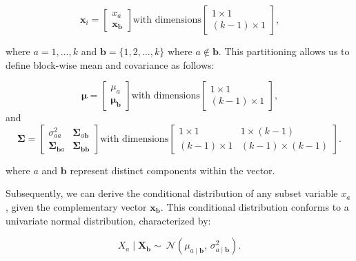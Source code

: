\begin{equation}
 \boldsymbol{x}_i = \begin{bmatrix}x_a \\ \boldsymbol{x_b} \end{bmatrix} \text{with dimensions} \begin{bmatrix}1\times 1 \\ (k - 1) \times 1\end{bmatrix} \text{,}
\end{equation}

where $a = 1,...,k$ and $\boldsymbol{b} = \{1, 2, \ldots, k\} \text{ where }a \notin \boldsymbol{b}$. This partitioning allows us to define block-wise mean and covariance as follows:

\begin{equation}
 \boldsymbol\mu = \begin{bmatrix}\mu_a \\ \boldsymbol{\mu_b} \end{bmatrix} \text{with dimensions} \begin{bmatrix}1\times 1 \\ (k - 1) \times 1\end{bmatrix} \text{,}
\end{equation}
and
\begin{equation}
 \boldsymbol\Sigma = \begin{bmatrix}\sigma_{aa}^2 & \boldsymbol\Sigma_{a\boldsymbol{b}} \\ \boldsymbol\Sigma_{\boldsymbol{b}a} & \boldsymbol\Sigma_{\boldsymbol{bb}} \end{bmatrix}
 \text{with dimensions} \begin{bmatrix}1\times 1 & 1\times (k - 1) \\ (k - 1) \times 1 & (k - 1) \times (k - 1)\end{bmatrix} \text{.} \label{eq:sigma}
\end{equation}

where $a$ and $\boldsymbol{b}$ represent distinct components within the vector.

Subsequently, we can derive the conditional distribution of any subset variable $x_a$, given the complementary vector $\boldsymbol{x_b}$. This conditional distribution conforms to a univariate normal distribution, characterized by:

\begin{equation}
  X_a \mid \mathbf{X}_{\boldsymbol{b}} \sim\ \mathcal{N}(\mu_{a \mid \boldsymbol{b}},\, \sigma_{a \mid \boldsymbol{b}}^2)\text{.}\label{eq:cond_distribution}
\end{equation}

